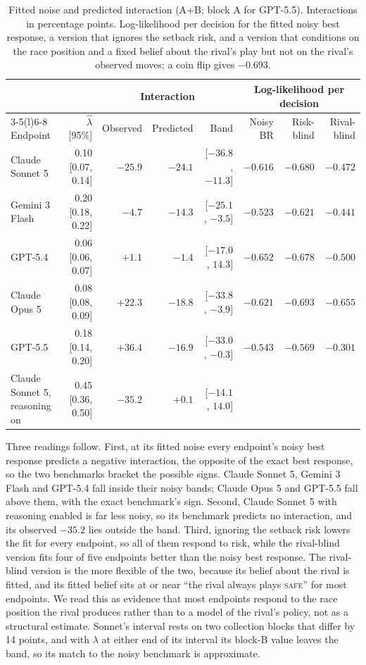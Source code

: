 \documentclass{article}
\newcommand{\Safe}{\textsc{safe}}
\begin{document}
\begin{table}[t]
\caption{Fitted noise and predicted interaction (A+B; block A for GPT-5.5).
Interactions in percentage points. Log-likelihood per decision for the fitted
noisy best response, a version that ignores the setback risk, and a version
that conditions on the race position and a fixed belief about the rival's play
but not on the rival's observed moves; a coin flip gives $-0.693$.}
\label{tab:supp-quantal}
\centering
\footnotesize
\setlength{\tabcolsep}{4pt}
\begin{tabular}{@{}lrrrrrrr@{}}
\toprule
 & & \multicolumn{3}{c}{Interaction} & \multicolumn{3}{c}{Log-likelihood per decision} \\
\cmidrule(lr){3-5}\cmidrule(l){6-8}
Endpoint & $\hat\lambda$ [95\%] & Observed & Predicted & Band & Noisy BR & Risk-blind & Rival-blind \\
\midrule
Claude Sonnet 5 & 0.10 [0.07, 0.14] & $-25.9$ & $-24.1$ & [$-36.8$, $-11.3$] & $-0.616$ & $-0.680$ & $-0.472$ \\
Gemini 3 Flash  & 0.20 [0.18, 0.22] & $-4.7$ & $-14.3$ & [$-25.1$, $-3.5$] & $-0.523$ & $-0.621$ & $-0.441$ \\
GPT-5.4         & 0.06 [0.06, 0.07] & $+1.1$ & $-1.4$ & [$-17.0$, $14.3$] & $-0.652$ & $-0.678$ & $-0.500$ \\
Claude Opus 5   & 0.08 [0.08, 0.09] & $+22.3$ & $-18.8$ & [$-33.8$, $-3.9$] & $-0.621$ & $-0.693$ & $-0.655$ \\
GPT-5.5         & 0.18 [0.14, 0.20] & $+36.4$ & $-16.9$ & [$-33.0$, $-0.3$] & $-0.543$ & $-0.569$ & $-0.301$ \\
\midrule
Claude Sonnet 5, reasoning on & 0.45 [0.36, 0.50] & $-35.2$ & $+0.1$ & [$-14.1$, $14.0$] & & & \\
\bottomrule
\end{tabular}
\end{table}

Three readings follow. First, at its fitted noise every endpoint's noisy best
response predicts a negative interaction, the opposite of the exact best
response, so the two benchmarks bracket the possible signs. Claude Sonnet 5,
Gemini 3 Flash and GPT-5.4 fall inside their noisy bands; Claude Opus 5 and
GPT-5.5 fall above them, with the exact benchmark's sign. Second, Claude Sonnet
5 with reasoning enabled is far less noisy, so its benchmark predicts no
interaction, and its observed $-35.2$ lies outside the band. Third, ignoring
the setback risk lowers the fit for every endpoint, so all of them respond to
risk, while the rival-blind version fits four of five
endpoints better than the noisy best response. The rival-blind version is the
more flexible of the two, because its belief about the rival is fitted, and its
fitted belief sits at or near ``the rival always plays \Safe{}'' for most
endpoints. We read this as evidence that most endpoints respond to the race
position the rival produces rather than to a model of the rival's policy, not as
a structural estimate. Sonnet's interval rests on two collection blocks that
differ by 14 points, and with $\lambda$ at either end of its interval its block-B
value leaves the band, so its match to the noisy benchmark is approximate.
\end{document}
